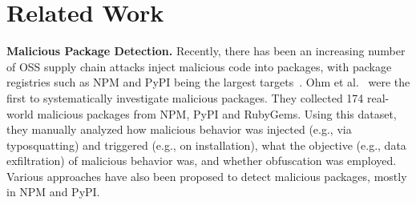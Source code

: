 
\section{Related Work}




\textbf{Malicious Package Detection.} Recently, there has been an increasing number of OSS supply chain attacks  inject malicious code into packages, with package registries such as NPM and PyPI being the largest targets~\cite{pypinpm, hundredsnpm}. Ohm et al.~\cite{ohm2020backstabber} were the first to systematically investigate malicious packages. They collected 174 real-world malicious packages from NPM, PyPI and RubyGems. Using this dataset, they manually analyzed how malicious behavior was injected (e.g., via typosquatting) and triggered (e.g., on installation), what the objective (e.g., data exfiltration) of malicious behavior was, and whether obfuscation was employed.  Various approaches have also been proposed to detect malicious packages, mostly in NPM and PyPI.

